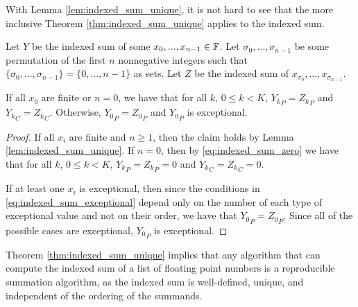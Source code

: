       With Lemma \ref{lem:indexed_sum_unique}, it is not hard to see that the more inclusive Theorem \ref{thm:indexed_sum_unique} applies to the indexed sum.

      \begin{samepage}
      \begin{thm}
        Let $Y$ be the indexed sum of some $x_0, ..., x_{n - 1} \in \mathbb{F}$.
        Let $\sigma_0, ..., \sigma_{n - 1}$ be some permutation of the first $n$ nonnegative integers such that $\{\sigma_0, ..., \sigma_{n - 1}\} = \{0, ..., n - 1\}$ as sets.
        Let $Z$ be the indexed sum of $x_{\sigma_0}, ..., x_{\sigma_{n - 1}}$.

        If all $x_0$ are finite or $n = 0$, we have that for all $k$, $0 \leq k < K$, ${Y_k}_P = {Z_k}_P$ and ${Y_k}_C = {Z_k}_C$. Otherwise, ${Y_0}_P = {Z_0}_P$ and ${Y_0}_P$ is exceptional.
        \label{thm:indexed_sum_unique}
      \end{thm}
      \end{samepage}
      \begin{proof}
        If all $x_i$ are finite and $n \geq 1$, then the claim holds by Lemma \ref{lem:indexed_sum_unique}. If $n = 0$, then by \eqref{eq:indexed_sum_zero} we have that
for all $k$, $0 \leq k < K$, ${Y_k}_P = {Z_k}_P = 0$ and ${Y_k}_C = {Z_k}_C = 0$.

        If at least one $x_i$ is exceptional, then since the conditions in \eqref{eq:indexed_sum_exceptional} depend only on the number of each type of exceptional value and not on their order, we have that ${Y_0}_P = {Z_0}_P$. Since all of the possible cases are exceptional, ${Y_0}_P$ is exceptional.
      \end{proof}

    Theorem \ref{thm:indexed_sum_unique} implies that any algorithm that can compute the indexed sum of a list of floating point numbers is a reproducible summation algorithm, as the indexed sum is well-defined, unique, and independent of the ordering of the summands.

